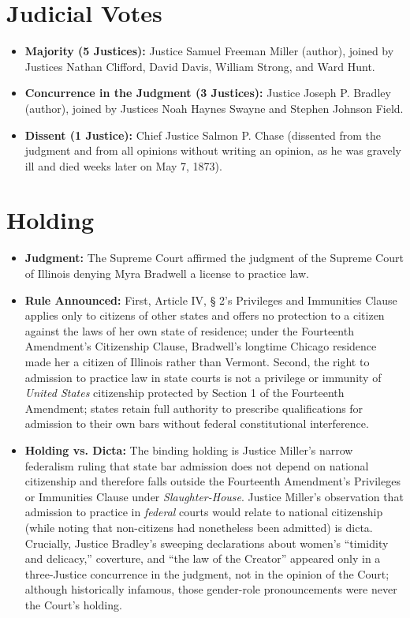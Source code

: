 \documentclass[12pt]{article}
\begin{document}
\section{Judicial Votes}

\begin{itemize}
  \item \textbf{Majority (5 Justices):} Justice Samuel Freeman Miller (author), joined by Justices Nathan Clifford, David Davis, William Strong, and Ward Hunt.
  \item \textbf{Concurrence in the Judgment (3 Justices):} Justice Joseph P. Bradley (author), joined by Justices Noah Haynes Swayne and Stephen Johnson Field.
  \item \textbf{Dissent (1 Justice):} Chief Justice Salmon P. Chase (dissented from the judgment and from all opinions without writing an opinion, as he was gravely ill and died weeks later on May 7, 1873).
\end{itemize}

\section{Holding}

\begin{itemize}
  \item \textbf{Judgment:} The Supreme Court affirmed the judgment of the Supreme Court of Illinois denying Myra Bradwell a license to practice law.
  \item \textbf{Rule Announced:} First, Article IV, \S{} 2's Privileges and Immunities Clause applies only to citizens of other states and offers no protection to a citizen against the laws of her own state of residence; under the Fourteenth Amendment's Citizenship Clause, Bradwell's longtime Chicago residence made her a citizen of Illinois rather than Vermont. Second, the right to admission to practice law in state courts is not a privilege or immunity of \textit{United States} citizenship protected by Section 1 of the Fourteenth Amendment; states retain full authority to prescribe qualifications for admission to their own bars without federal constitutional interference.
  \item \textbf{Holding vs. Dicta:} The binding holding is Justice Miller's narrow federalism ruling that state bar admission does not depend on national citizenship and therefore falls outside the Fourteenth Amendment's Privileges or Immunities Clause under \textit{Slaughter-House}. Justice Miller's observation that admission to practice in \textit{federal} courts would relate to national citizenship (while noting that non-citizens had nonetheless been admitted) is dicta. Crucially, Justice Bradley's sweeping declarations about women's ``timidity and delicacy,'' coverture, and ``the law of the Creator'' appeared only in a three-Justice concurrence in the judgment, not in the opinion of the Court; although historically infamous, those gender-role pronouncements were never the Court's holding.
\end{itemize}
\end{document}

